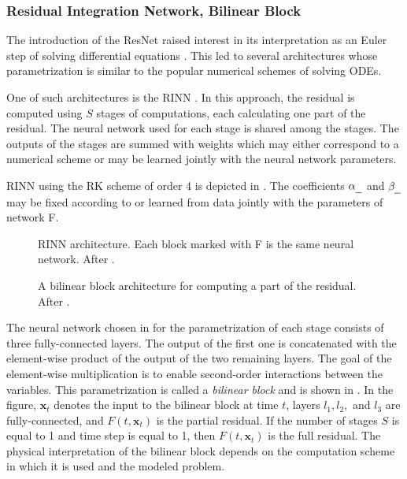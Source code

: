 \subsubsection{Residual Integration Network, Bilinear Block}

The introduction of the \ac{ResNet} raised interest in its interpretation as an Euler step of solving differential equations \cite{Chen2018}.
This led to several architectures whose parametrization is similar to the popular numerical schemes of solving \acp{ODE}.

One of such architectures is the \acf{RINN} \cite{Ouala2019}.
In this approach, the residual is computed using $S$ stages of computations, each calculating one part of the residual. The neural network used for each stage is shared among the stages. The outputs of the stages are summed with weights which may either correspond to a numerical scheme or may be learned jointly with the neural network parameters.

\Ac{RINN} using the \ac{RK} scheme of order 4 is depicted in . The coefficients $\alpha_\text{\underline{\hspace{2mm}}}$ and $\beta_\text{\underline{\hspace{2mm}}}$ may be fixed according to  or learned from data jointly with the parameters of network F.

\begin{figure}
  \centering
  \scalebox{0.83}{}
  \caption{\Acl{RINN} architecture. Each block marked with F is the same neural network. After \cite{Fablet2017}.}
  \label{fig:rinn4}
\end{figure}

\begin{figure}
  \centering
  \scalebox{0.7}{}
  \caption{A bilinear block architecture for computing a part of the residual. After \cite{Fablet2017}.}
  \label{fig:bilinear_block}
\end{figure}

The neural network chosen in \cite{Ouala2019}
for the parametrization of each stage consists of three fully-connected layers. The output of the first one is concatenated with the element-wise product of the output of the two remaining layers. The goal of the element-wise multiplication is to enable second-order interactions between the variables. This parametrization is called a \emph{bilinear block} \cite{Fablet2017} and is shown in . In the figure, $\pmb{x}_t$ denotes the input to the bilinear block at time $t$, layers $l_1, l_2,$ and $l_3$ are fully-connected, and $F(t, \pmb{x}_t)$ is the partial residual. If the number of stages $S$ is equal to 1 and time step is equal to 1, then $F(t, \pmb{x}_t)$ is the full residual. The physical interpretation of the bilinear block depends on the computation scheme in which it is used and the modeled problem.



